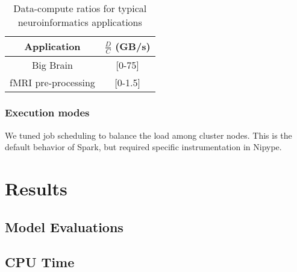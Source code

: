 \documentclass{IEEEtran}
\begin{document}

\begin{table}
\centering
\begin{tabular}{c|c}
Application & $\frac{D}{C}$ (GB/s)\\
\hline
Big Brain            & [0-75] \\
fMRI pre-processing  & [0-1.5]
\end{tabular}
\label{table:applications}
\caption{Data-compute ratios for typical neuroinformatics applications}
\end{table}



\subsubsection{Execution modes} %

We tuned job scheduling to balance the load among
cluster nodes. This is the default behavior of Spark, but required
specific instrumentation in Nipype.






\section{Results} %
\label{sec:results}


\subsection{Model Evaluations}

\subsection{CPU Time}
% 
\end{document}
